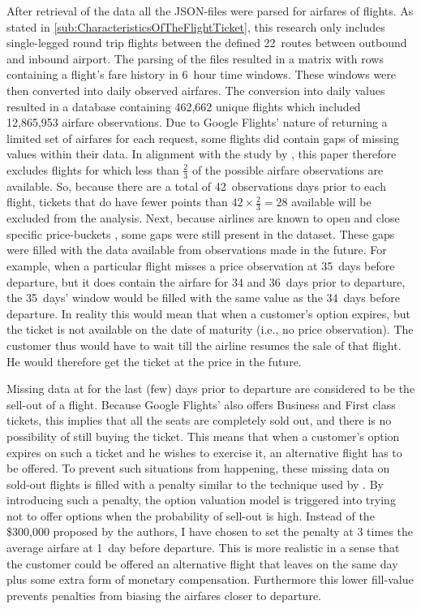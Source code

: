 After retrieval of the data all the JSON-files were parsed for airfares of flights. As stated in \autoref{sub:CharacteristicsOfTheFlightTicket}, this research only includes single-legged round trip flights between the defined 22~routes between outbound and inbound airport. The parsing of the files resulted in a matrix with rows containing a flight's fare history in 6~hour time windows. These windows were then converted into daily observed airfares. The conversion into daily values resulted in a database containing 462,662 unique flights which included 12,865,953 airfare observations. Due to Google Flights' nature of returning a limited set of airfares for each request, some flights did contain gaps of missing values within their data. In alignment with the study by , this paper therefore excludes flights for which less than $\frac{2}{3}$ of the possible airfare observations are available. So, because there are a total of 42~observations days prior to each flight, tickets that do have fewer points than $42 \times \frac{2}{3} = 28$ available will be excluded from the analysis. Next, because airlines are known to open and close specific price-buckets \cite{mcgill1999revenue}, some gaps were still present in the dataset. These gaps were filled with the data available from observations made in the future. For example, when a particular flight misses a price observation at 35~days before departure, but it does contain the airfare for 34 and 36~days prior to departure, the 35~days' window would be filled with the same value as the 34~days before departure. In reality this would mean that when a customer's option expires, but the ticket is not available on the date of maturity (i.e., no price observation). The customer thus would have to wait till the airline resumes the sale of that flight. He would therefore get the ticket at the price in the future.

Missing data at for the last (few) days prior to departure are considered to be the sell-out of a flight. Because Google Flights' also offers Business and First class tickets, this implies that all the seats are completely sold out, and there is no possibility of still buying the ticket. This means that when a customer's option expires on such a ticket and he wishes to exercise it, an alternative flight has to be offered. To prevent such situations from happening, these missing data on sold-out flights is filled with a penalty similar to the technique used by . By introducing such a penalty, the option valuation model is triggered into trying not to offer options when the probability of sell-out is high. Instead of the \$300,000 proposed by the authors, I have chosen to set the penalty at 3 times the average airfare at 1~day before departure. This is more realistic in a sense that the customer could be offered an alternative flight that leaves on the same day plus some extra form of monetary compensation. Furthermore this lower fill-value prevents penalties from biasing the airfares closer to departure.

